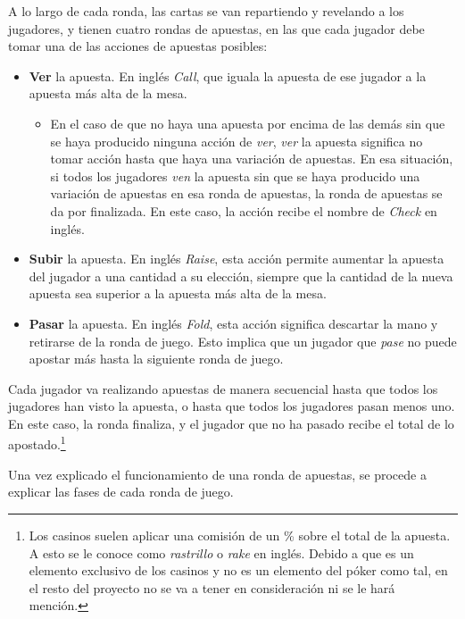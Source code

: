 A lo largo de cada ronda, las cartas se van repartiendo y revelando a los jugadores, y tienen cuatro rondas de apuestas, en las que cada jugador debe tomar una de las acciones de apuestas posibles:
\begin{itemize}
\item \textbf{Ver} la apuesta. En inglés \textit{Call}, que iguala la apuesta de ese jugador a la apuesta más alta de la mesa.
\begin{itemize}
\item En el caso de que no haya una apuesta por encima de las demás sin que se haya producido ninguna acción de \textit{ver}, \textit{ver} la apuesta significa no tomar acción hasta que haya una variación de apuestas. En esa situación, si todos los jugadores \textit{ven} la apuesta sin que se haya producido una variación de apuestas en esa ronda de apuestas, la ronda de apuestas se da por finalizada. En este caso, la acción recibe el nombre de \textit{Check} en inglés.
\end{itemize}
\item \textbf{Subir} la apuesta. En inglés \textit{Raise}, esta acción permite aumentar la apuesta del jugador a una cantidad a su elección, siempre que la cantidad de la nueva apuesta sea superior a la apuesta más alta de la mesa.
\item \textbf{Pasar} la apuesta. En inglés \textit{Fold}, esta acción significa descartar la mano y retirarse de la ronda de juego. Esto implica que un jugador que \textit{pase} no puede apostar más hasta la siguiente ronda de juego. 
\end{itemize}

Cada jugador va realizando apuestas de manera secuencial hasta que todos los jugadores han visto la apuesta, o hasta que todos los jugadores pasan menos uno. En este caso, la ronda finaliza, y el jugador que no ha pasado recibe el total de lo apostado.\footnote{Los casinos suelen aplicar una comisión de un \% sobre el total de la apuesta. A esto se le conoce como \textit{rastrillo} o \textit{rake} en inglés. Debido a que es un elemento exclusivo de los casinos y no es un elemento del póker como tal, en el resto del proyecto no se va a tener en consideración ni se le hará mención.}  

Una vez explicado el funcionamiento de una ronda de apuestas, se procede a explicar las fases de cada ronda de juego.

